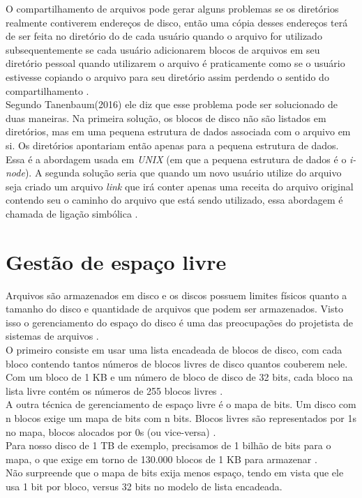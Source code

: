 O compartilhamento de arquivos pode gerar alguns problemas se os diretórios realmente contiverem endereços de disco, então uma cópia desses endereços terá de ser feita no diretório do de cada usuário quando o arquivo for utilizado subsequentemente se cada usuário adicionarem blocos de arquivos em seu diretório pessoal quando utilizarem o arquivo é praticamente como se o usuário estivesse copiando o arquivo para seu diretório assim perdendo o sentido do compartilhamento \cite{Tanenbaum2016}.\\
Segundo Tanenbaum(2016) ele diz que esse problema pode ser solucionado de duas maneiras. Na primeira solução, os blocos de disco não são listados em diretórios, mas em uma pequena estrutura de dados associada com o arquivo em si. Os diretórios apontariam então apenas para a pequena estrutura de dados. Essa é a abordagem usada em \emph{UNIX} (em que a pequena estrutura de dados é o \emph{i-node}).
A segunda solução seria que quando um novo usuário utilize do arquivo seja criado um arquivo \emph{link} que irá conter apenas uma receita do arquivo original contendo seu o caminho do arquivo que está sendo utilizado, essa abordagem é chamada de ligação simbólica \cite{Tanenbaum2016}.

\section{Gestão de espaço livre}

Arquivos são armazenados em disco e os discos possuem limites físicos quanto a tamanho do disco e quantidade de arquivos que podem ser armazenados. Visto isso o gerenciamento do espaço do disco é uma das preocupações do projetista de sistemas de arquivos \cite{Tanenbaum2016}. \\
O primeiro consiste em usar uma lista encadeada de blocos de disco, com cada bloco contendo tantos números de blocos livres de disco quantos couberem nele. Com um bloco de 1 KB e um número de bloco de disco de 32 bits, cada bloco na lista livre contém os números de 255 blocos livres \cite{Tanenbaum2016}.\\
A outra técnica de gerenciamento de espaço livre é o mapa de bits. Um disco com n blocos exige um mapa de bits com n bits. Blocos livres são representados por 1s no mapa, blocos alocados por 0s (ou vice-versa) \cite{Tanenbaum2016}.\\ Para nosso disco de 1 TB de exemplo, precisamos de 1 bilhão de bits para o mapa, o que exige em torno de 130.000 blocos de 1 KB para armazenar \cite{Tanenbaum2016}.\\ Não surpreende que o mapa de bits exija menos espaço, tendo em vista que ele usa 1 bit por bloco, versus 32 bits no modelo de lista encadeada.  

